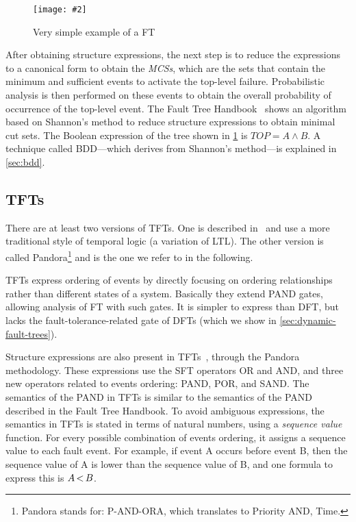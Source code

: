 \documentclass[12pt,openright,twoside,a4paper,oldfontcommands,english,brazil,draft]{abntex2}
\theoremstyle{theo}
\newcommand{\includegraphicsaspectratio}[2][1]{%
  \texttt{[image: \#2]}%
}
\def\FThandbook{Fault Tree Handbook~\cite{VGR+1981}\index{Fault Tree!Handbook}%
  \gdef\FThandbook{Fault Tree Handbook\index{Fault Tree!Handbook}\xspace}%
  \xspace}
\def\pandora{Pandora\footnote{Pandora stands for: P-AND-ORA, which translates to Priority AND, Time.}%
  \gdef\pandora{Pandora\xspace}%
  \xspace}
\def\pand{\ensuremath\operatorname{<}}
\begin{document}
\begin{figure}[t]
  \centering
  \includegraphicsaspectratio[0.45]{ex-fault-tree1}
  \caption{Very simple example of a \acl{FT}}
  \label{fig:ex-fault-tree1}
\end{figure}

After obtaining structure expressions, the next step is to reduce the expressions to a canonical form to obtain the \emph{\acp{MCS}}, which are the sets that contain the minimum and sufficient events to activate the top-level failure.
Probabilistic analysis is then performed on these events to obtain the overall probability of occurrence of the top-level event.
The \FThandbook shows an algorithm based on Shannon's method to reduce structure expressions to obtain minimal cut sets.
The Boolean expression of the tree shown in \cref{fig:ex-fault-tree1} is $TOP = A \wedge B$.
A technique called \ac{BDD}---which derives from Shannon's method---is explained in \cref{sec:bdd}.

\subsection{\Aclp{TFT}}
\label{sec:temporal-fault-trees}

There are at least two versions of \acp{TFT}.
One is described in~\cite{Palshikar2002} and use a more traditional style of temporal logic (a variation of \ac{LTL}).
The other version is called \pandora and is the one we refer to in the following.

\Acp{TFT} express ordering of events by directly focusing on ordering relationships rather than different states of a system. Basically they extend  \ac{PAND} gates, allowing analysis of \ac{FT} with such gates.
It is simpler to express than \ac{DFT}, but lacks the fault-tolerance-related gate of \acp{DFT} (which we show in \cref{sec:dynamic-fault-trees}).

\begin{sloppypar}
Structure expressions are also present in \acp{TFT}~\cite{WP2009,Walker2009,WP2010}, through the \pandora methodology.
These expressions use the \ac{SFT} operators \ac{OR} and \ac{AND}, and three new operators related to events ordering: \acf{PAND}, \ac{POR}, and \ac{SAND}.
The semantics of the \ac{PAND} in \acp{TFT} is similar to the semantics of the \ac{PAND} described in the \FThandbook.
To avoid ambiguous expressions, the semantics in \acp{TFT} is stated in terms of natural numbers, using a \emph{sequence value} function.
For every possible combination of events ordering, it assigns a sequence value to each fault event.
For example, if event A occurs before event B, then the sequence value of A is lower than the sequence value of B, and one formula to express this is $A \pand B$.
\end{sloppypar}
\end{document}
